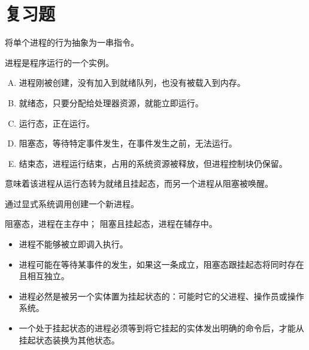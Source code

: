 
\section{复习题}
{
    \begin{reviewc}
        将单个进程的行为抽象为一串指令。
    \end{reviewc}

    \begin{reviewc}
        进程是程序运行的一个实例。
    \end{reviewc}

    \begin{reviewc}
        \begin{enumerate}[A.]
            \item 进程刚被创建，没有加入到就绪队列，也没有被载入到内存。
            \item 就绪态，只要分配给处理器资源，就能立即运行。
            \item 运行态，正在运行。
            \item 阻塞态，等待特定事件发生，在事件发生之前，无法运行。
            \item 结束态，进程运行结束，占用的系统资源被释放，但进程控制块仍保留。
        \end{enumerate}
    \end{reviewc}

    \begin{reviewc}
        意味着该进程从运行态转为就绪且挂起态，而另一个进程从阻塞被唤醒。
    \end{reviewc}

    \begin{reviewc}
        通过显式系统调用创建一个新进程。
    \end{reviewc}

    \begin{reviewc}
        阻塞态，进程在主存中；
        阻塞且挂起态，进程在辅存中。
    \end{reviewc}

    \begin{reviewc}
        \begin{itemize}
            \item 进程不能够被立即调入执行。
            \item 进程可能在等待某事件的发生，如果这一条成立，阻塞态跟挂起态将同时存在且相互独立。
            \item 进程必然是被另一个实体置为挂起状态的：可能时它的父进程、操作员或操作系统。
            \item 一个处于挂起状态的进程必须等到将它挂起的实体发出明确的命令后，才能从挂起状态装换为其他状态。
        \end{itemize}
    \end{reviewc}

}
